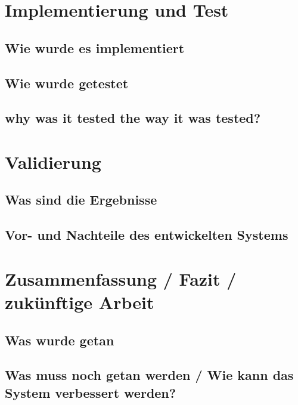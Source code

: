 \section{Implementierung und Test}
\subsection{Wie wurde es implementiert}
\subsection{Wie wurde getestet}
\subsection{why was it tested the way it was tested?}
\section{Validierung}
\subsection{Was sind die Ergebnisse}
\subsection{Vor- und Nachteile des entwickelten Systems}
\section{Zusammenfassung / Fazit / zukünftige Arbeit}
\subsection{Was wurde getan}
\subsection{Was muss noch getan werden / Wie kann das System verbessert werden?}


